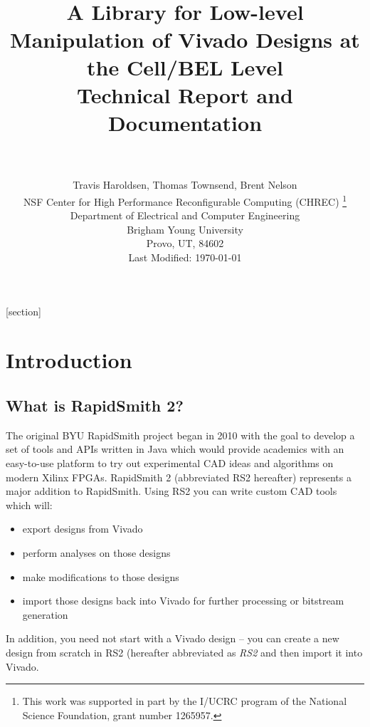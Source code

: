 \documentclass[12pt]{article}
\begin{document}
[section]

\date{}
\title{\bf \Huge {}\\[0.4in]
\hline\\[0.1in]
A Library for Low-level Manipulation 
of Vivado Designs at the Cell/BEL Level\\[0.3in]
Technical Report and Documentation\\[0.1in]
\hline\\[0.3in]
}
\author{\Large Travis Haroldsen, Thomas Townsend, Brent Nelson\\[0.2in]
\large NSF Center for High Performance Reconfigurable Computing (CHREC)
\thanks{This work was supported in part by the I/UCRC program of the National
 Science Foundation, grant number 1265957.}\\
\large Department of Electrical and Computer Engineering  \\
\large  Brigham Young University \\
\large  Provo, UT, 84602 \\[1in]
\large Last Modified: \today \\[0.5in]
}

\maketitle
\newpage
\tableofcontents


% 

\newpage
\section{Introduction}
\subsection{What is RapidSmith 2?}
The original BYU RapidSmith project began in 2010 with the goal to develop
a set of tools and APIs written in Java which would provide academics with an
easy-to-use platform to try out experimental CAD ideas and algorithms on modern
Xilinx FPGAs.  RapidSmith 2 (abbreviated RS2 hereafter) represents a major
addition to RapidSmith.  Using RS2 you can write custom CAD tools which will:
\begin{itemize}
  \item export designs from Vivado
  \item perform analyses on those designs
  \item make modifications to those designs
  \item import those designs back into Vivado for further processing or bitstream generation
\end{itemize}
In addition, you need not start with a Vivado design – you can create a new
design from scratch in RS2 (hereafter abbreviated as {\em RS2} and then
import it into Vivado.
\end{document}
